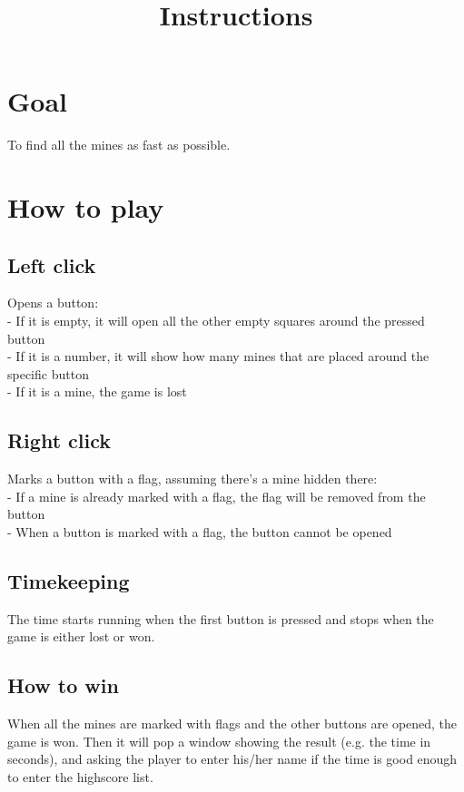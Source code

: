 \documentclass[12pt,twoside,a4paper]{article}
\title{Instructions}
\begin{document}
\maketitle

\section{Goal}

To find all the mines as fast as possible.

\section{How to play}

\subsection{Left click}

Opens a button: \\
- If it is empty, it will open all the other empty squares around the pressed button \\
- If it is a number, it will show how many mines that are placed around the specific button \\
- If it is a mine, the game is lost \\

\subsection{Right click} 

Marks a button with a flag, assuming there's a mine hidden there: \\
- If a mine is already marked with a flag, the flag will be removed from the button \\
- When a button is marked with a flag, the button cannot be opened \\

\subsection{Timekeeping}

The time starts running when the first button is pressed and stops when the game is either lost or won.

\subsection{How to win}

When all the mines are marked with flags and the other buttons are opened, the game is won. Then it will pop a 
window showing the result (e.g. the time in seconds), and asking the player to enter his/her name if the time is good 
enough to enter the highscore list.
\end{document}
